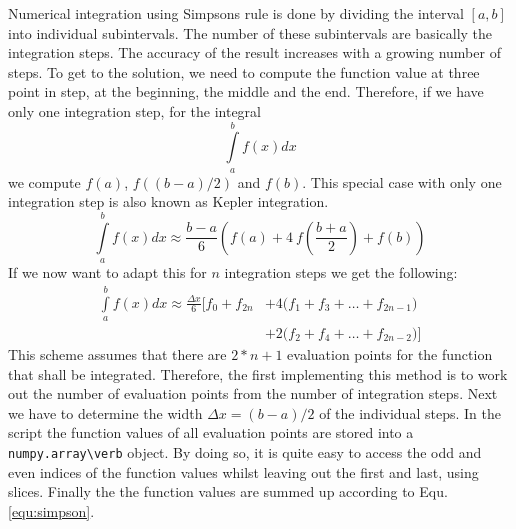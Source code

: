 \documentclass{aa}
\begin{document}
Numerical integration using Simpsons rule is done by dividing the interval \([a,
b]\) into individual subintervals. The number of these subintervals are
basically the integration steps. The accuracy of the result increases with a
growing number of steps. To get to the solution, we need to compute the
function value at three point in step, at the beginning, the middle and the end.
Therefore, if we have only one integration step, for the integral
\begin{equation}
    \int\limits_a^b f(x) dx 
\end{equation}
we compute \(f(a)\), \(f((b-a)/2)\) and \(f(b)\). This special case with only
one integration step is also known as Kepler integration.
\begin{equation}
    \int\limits_a^b f(x) dx \approx \frac{b - a}{6} \left(f(a) + 
    4~f\left(\frac{b + a}{2}\right) + f(b)\right)
\end{equation}
If we now want to adapt this for \(n\) integration steps we get the following:
\begin{equation}
    \label{equ:simpson}
    \begin{split}
        \int\limits_a^b f(x) dx \approx \frac{\Delta x}{6} 
        \bigg[f_0 + f_{2n} & + 4\Big(f_1 + f_3 + \dots + f_{2n-1}\Big) \\
        & + 2\Big(f_2 + f_4 + \dots + f_{2n-2}\Big)\bigg]
    \end{split}
\end{equation}
This scheme assumes that there are \(2*n + 1\) evaluation points for the
function that shall be integrated. Therefore, the first implementing this method
is to work out the number of evaluation points from the number of integration
steps. Next we have to determine the width \(\Delta x = (b - a)/2\) of the
individual steps. In the script the function values of all evaluation points are
stored into a \verb+numpy.array\verb+ object. By doing so, it is quite easy to
access the odd and even indices of the function values whilst leaving out the
first and last, using slices. Finally the the function values are summed up
according to Equ. \ref{equ:simpson}.
\end{document}
